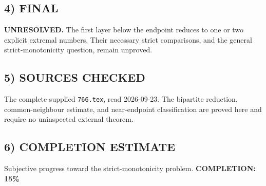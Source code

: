\subsection*{4) FINAL}
\textbf{UNRESOLVED.} The first layer below the endpoint reduces to one or two explicit extremal numbers. Their necessary strict comparisons, and the general strict-monotonicity question, remain unproved.
\subsection*{5) SOURCES CHECKED}
The complete supplied \texttt{766.tex}, read 2026-09-23. The bipartite reduction, common-neighbour estimate, and near-endpoint classification are proved here and require no uninspected external theorem.
\subsection*{6) COMPLETION ESTIMATE}
Subjective progress toward the strict-monotonicity problem.
\textbf{COMPLETION: 15\%}
